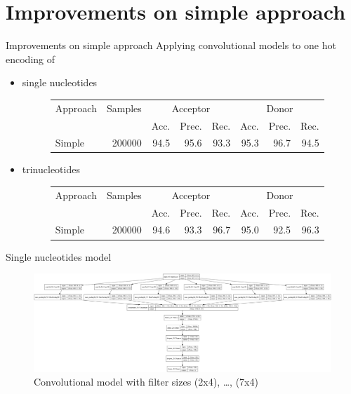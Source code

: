 \documentclass[10pt]{beamer}
\begin{document}
\section{Improvements on simple approach}
\begin{frame}{Improvements on simple approach}
	Applying convolutional models to one hot encoding of
	\begin{itemize}
		\item single nucleotides
		\begin{figure}
			\small
			\centering
			\begingroup
			\def\arraystretch{1.2}
			\begin{tabular}{|l|r|r|r|r|r|r|r|}
				\hline
				Approach  & Samples & \multicolumn{3}{c|}{Acceptor} & \multicolumn{3}{c|}{Donor} \\
				\cline{3-8}
				& & Acc. & Prec. & Rec. & Acc. & Prec. & Rec. \\
				\hline
				Simple & 200000 & 94.5 & 95.6 & 93.3 & 95.3 & 96.7 & 94.5 \\
				
				\hline  
			\end{tabular}
			\endgroup
		\end{figure}
		\item trinucleotides
		\begin{figure}
			\small
			\centering
			\begingroup
			\def\arraystretch{1.2}
			\begin{tabular}{|l|r|r|r|r|r|r|r|}
				\hline
				Approach  & Samples & \multicolumn{3}{c|}{Acceptor} & \multicolumn{3}{c|}{Donor} \\
				\cline{3-8}
				& & Acc. & Prec. & Rec. & Acc. & Prec. & Rec. \\
				\hline
				Simple & 200000 & 94.6 & 93.3 & 96.7 & 95.0 & 92.5 & 96.3 \\
				
				\hline  
			\end{tabular}
			\endgroup
		\end{figure}
	\end{itemize}
\end{frame}

\begin{frame}{Single nucleotides model}
	\begin{figure}[ht]
		\centering
		\includegraphics[width = 1.05\textwidth]{../../models/plotted_models/simple_model.png}
		\caption{Convolutional model with filter sizes (2x4), \dots, (7x4)}
	\end{figure}
\end{frame}
\end{document}
